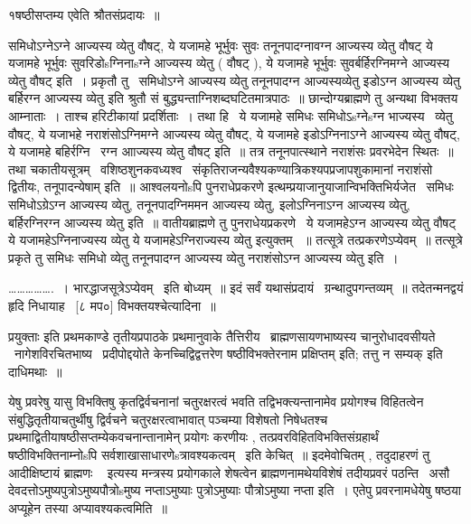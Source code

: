 \documentclass[11pt, openany]{book}
\begin{document}
१षष्ठीसप्तम्य एवेति श्रौतसंप्रदायः~॥ 



समिधोऽग्नेऽग्ने आज्यस्य व्येतु वौषट्, ये यजामहे भूर्भुवः सुवः
तनूनपादग्नावग्न आज्यस्य व्येतु वौषट् ये यजामहे भूर्भुवः
सुवरिडोsग्निनाsग्ने आज्यस्य व्येतु ( वौषट् ), ये यजामहे भूर्भुवः
सुवर्बर्हिरग्निमग्ने आज्यस्य व्येतु वौषट् इति~। प्रकृतौ तु \textendash\ {\qt समिधोऽग्ने
आज्यस्य व्येतु तनूनपादग्न आज्यस्यव्येतु इडोऽग्न आज्यस्य व्येतु
बर्हिरग्न आज्यस्य व्येतु} इति श्रुतौ सं
बुद्ध्यन्ताग्निशब्दघटितमात्रपाठः~॥ छान्दोग्यब्राह्मणे तु अन्यथा विभक्तय
आम्नाताः~। ताश्च हरिटीकायां प्रदर्शिताः~। तथा हि \textendash\ ये यजामहे समिधः
समिधोऽsग्नेsग्न भाज्यस्य \textendash\ व्येतु वौषट्, ये यजाभहे नराशंसोऽग्निमग्ने
आज्यस्य व्येतु वौषट्, ये यजामहे इडोऽग्निनाऽग्ने आज्यस्य व्येतु
वौषट्, ये यजामहे बहिर्रग्नि \textendash\ रग्न आाज्यस्य व्येतु वौषट् इति~॥ तत्र
तनूनपात्स्थाने नराशंसः प्रवरभेदेन स्थितः~॥ तथा
चकातीयसूत्रम् \textendash\ वशिष्ठशुनकवध्यश्व \textendash\ 
संकृतिराजन्यवैश्यकण्यात्रिकश्यपप्रजापशुकामानां नराशंसो द्वितीयः,
{\qt तनूपादन्येषाम्} इति~॥ आश्वलयनोsपि पुनराधेप्रकरणे
इत्थम्प्रयाजानुयाजान्विभक्तिभिर्यजेत \textendash\ समिधः समिधोऽग्रेऽग्न आज्यस्य
व्येतु, तनूनपादग्निममन आज्यस्य व्येतु, इलोऽग्निनाऽग्न आज्यस्य
व्येतु, {\qt बर्हिरग्निरग्न आज्यस्य व्येतु} इति~॥ वातीयब्राह्मणे तु
पुनराधेयप्रकरणे \textendash\ ये यजामहेऽग्न आज्यस्य व्येतु वौषट् ये
यजामहेऽग्निनाज्यस्य व्येतु ये {\qt यजामहेऽग्निराज्यस्य व्येतु} इत्युक्तम्
~॥ तत्सूत्रे तत्प्रकरणेऽप्येवम्~॥ तत्सूत्रे प्रकृते तु समिधः समिधो
व्येतु तनूनपादग्न आज्यस्य व्येतु नराशंसोऽग्न आज्यस्य व्येतु इति~। 


 \ldots\ldots\ldots\ldots\ldots.~। 
भारद्धाजसूत्रेऽप्येवम् \textendash\ इति बोध्यम्~॥ इदं सर्वं यथासंप्रदायं
 \textendash\ ग्रन्थादुपगन्तव्यम्~॥ तदेतन्मनद्वयं हृदि निधायाह \textendash\ [८ मप०]
विभक्तयश्चेत्यादिना~॥ 



प्रयुक्ताः इति प्रथमकाण्डे तृतीयप्रपाठके प्रथमानुवाके तैत्तिरीय \textendash\ 
ब्राह्मणसायणभाष्यस्य चानुरोधादवसीयते \textendash\ {\qt नागेशविरचितभाष्य \textendash\ प्रदीपोद्दयोते
केनच्चिद्विद्वत्तरेण षष्ठीविभक्तेरनाम प्रक्षिप्तम्} इति; तत्तु न सम्यक्
इति दाधिमथाः~॥ 

 येषु प्रवरेषु यासु विभक्तिषु कृतद्विर्वचनानां चतुरक्षरत्वं भवति
तद्विभक्त्यन्तानामेव प्रयोगश्च विहितत्वेन संबुद्धितृतीयाचतुर्थीषु
द्विर्वचने चतुरक्षरत्वाभावात् पञ्चम्या विशेषतो निषेधतश्च
प्रथमाद्वितीयाषष्ठीसप्तम्येकवचनान्तानामेन् प्रयोगः करणीयः ,
तत्प्रवरविहितविभक्तिसंग्रहार्थं षष्ठीविभक्तिनाम्नोsपि
सर्वशाखासाधारणेsत्रावश्यकत्वम् \textendash\ इति केचित्~॥ इदमेवोचितम् , तदुदाहरणं तु
{\qt आदीक्षिष्टायं ब्राह्मणः \textendash\ } इत्यस्य मन्त्रस्य प्रयोगकाले शेषत्वेन
ब्राह्मणनामथेयविशेषं तदीयप्रवरं पठन्ति \textendash\ असौ
देवदत्तोऽमुष्यपुत्रोऽमुष्यपौत्रोsमुष्य नप्ताऽमुष्याः पुत्रोऽमुष्याः
पौत्रोऽमुष्या नप्ता इति~। एतेपु प्रवरनामधेयेषु षष्ठया अप्यूहेन तस्या
अप्यावश्यकत्वमिति~॥ 
\end{document}
